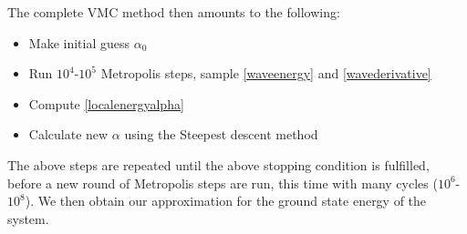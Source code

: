\documentclass[english, a4paper]{article}
\begin{document}
The complete VMC method then amounts to the following:
\begin{itemize}
 \item Make initial guess $\alpha_0$
 \item Run $10^4$-$10^5$ Metropolis steps, sample \eqref{waveenergy} and \eqref{wavederivative}
 \item Compute \eqref{localenergyalpha} 
 \item Calculate new $\alpha$ using the Steepest descent method
\end{itemize}
The above steps are repeated until the above stopping condition is fulfilled, before a new round of
Metropolis steps are run, this time with many cycles ($10^6$-$10^8$). We then obtain our approximation
for the ground state energy of the system.\\
\end{document}
